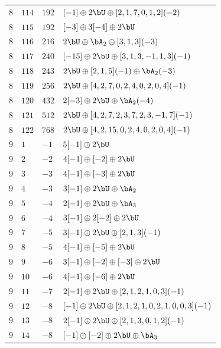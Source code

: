\begin{center}
\begin{longtable}{llll}
 \(8\) & \(114\) & \(192\) & \([-1] \oplus 2 \bU \oplus [2, 1, 7, 0, 1, 2](-2)\) \\
 \(8\) & \(115\) & \(192\) & \([-3] \oplus 3 [-4] \oplus 2 \bU\) \\
 \(8\) & \(116\) & \(216\) & \(2 \bU \oplus \bA_{2} \oplus [3, 1, 3](-3)\) \\
 \(8\) & \(117\) & \(240\) & \([-15] \oplus 2 \bU \oplus [3, 1, 3, -1, 1, 3](-1)\) \\
 \(8\) & \(118\) & \(243\) & \(2 \bU \oplus [2, 1, 5](-1) \oplus \bA_{2}(-3)\) \\
 \(8\) & \(119\) & \(256\) & \(2 \bU \oplus [4, 2, 7, 0, 2, 4, 0, 2, 0, 4](-1)\) \\
 \(8\) & \(120\) & \(432\) & \(2 [-3] \oplus 2 \bU \oplus \bA_{2}(-4)\) \\
 \(8\) & \(121\) & \(512\) & \(2 \bU \oplus [4, 2, 7, 2, 3, 7, 2, 3, -1, 7](-1)\) \\
 \(8\) & \(122\) & \(768\) & \(2 \bU \oplus [4, 2, 15, 0, 2, 4, 0, 2, 0, 4](-1)\) \\
\midrule
 \(9\) & \(1\) & \(-1\) & \(5 [-1] \oplus 2 \bU\) \\
 \(9\) & \(2\) & \(-2\) & \(4 [-1] \oplus [-2] \oplus 2 \bU\) \\
 \(9\) & \(3\) & \(-3\) & \(4 [-1] \oplus [-3] \oplus 2 \bU\) \\
 \(9\) & \(4\) & \(-3\) & \(3 [-1] \oplus 2 \bU \oplus \bA_{2}\) \\
 \(9\) & \(5\) & \(-4\) & \(2 [-1] \oplus 2 \bU \oplus \bA_{3}\) \\
 \(9\) & \(6\) & \(-4\) & \(3 [-1] \oplus 2 [-2] \oplus 2 \bU\) \\
 \(9\) & \(7\) & \(-5\) & \(3 [-1] \oplus 2 \bU \oplus [2, 1, 3](-1)\) \\
 \(9\) & \(8\) & \(-5\) & \(4 [-1] \oplus [-5] \oplus 2 \bU\) \\
 \(9\) & \(9\) & \(-6\) & \(3 [-1] \oplus [-2] \oplus [-3] \oplus 2 \bU\) \\
 \(9\) & \(10\) & \(-6\) & \(4 [-1] \oplus [-6] \oplus 2 \bU\) \\
 \(9\) & \(11\) & \(-7\) & \(2 [-1] \oplus 2 \bU \oplus [2, 1, 2, 1, 0, 3](-1)\) \\
 \(9\) & \(12\) & \(-8\) & \([-1] \oplus 2 \bU \oplus [2, 1, 2, 1, 0, 2, 1, 0, 0, 3](-1)\) \\
 \(9\) & \(13\) & \(-8\) & \(2 [-1] \oplus 2 \bU \oplus [2, 1, 3, 0, 1, 2](-1)\) \\
 \(9\) & \(14\) & \(-8\) & \([-1] \oplus [-2] \oplus 2 \bU \oplus \bA_{3}\) \\

\end{longtable}
\end{center}
